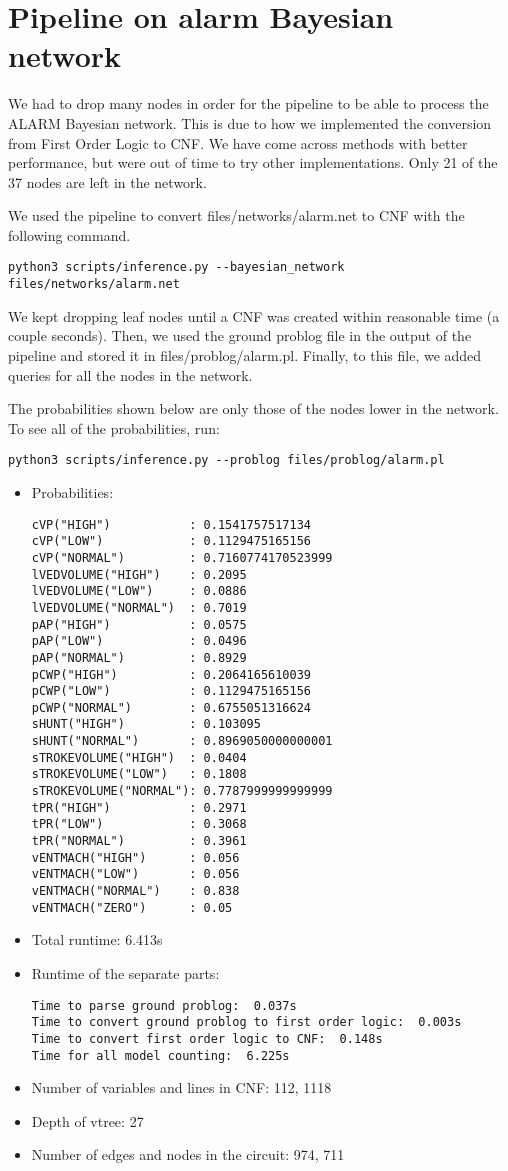 \section{Pipeline on alarm Bayesian network}
We had to drop many nodes in order for the pipeline to be able to process the ALARM Bayesian network. This is due to how we implemented the conversion from First Order Logic to CNF. We have come across methods with better performance, but were out of time to try other implementations. Only 21 of the 37 nodes are left in the network.

We used the pipeline to convert files/networks/alarm.net to CNF with the following command.
\begin{lstlisting}
python3 scripts/inference.py --bayesian_network files/networks/alarm.net
\end{lstlisting}
We kept dropping leaf nodes until a CNF was created within reasonable time (a couple seconds). Then, we used the ground problog file in the output of the pipeline and stored it in files/problog/alarm.pl. Finally, to this file, we added queries for all the nodes in the network.

The probabilities shown below are only those of the nodes lower in the network. To see all of the probabilities, run:
\begin{lstlisting}
python3 scripts/inference.py --problog files/problog/alarm.pl
\end{lstlisting}
\begin{itemize}
    \item Probabilities:
    \begin{lstlisting}
cVP("HIGH")           : 0.1541757517134
cVP("LOW")            : 0.1129475165156
cVP("NORMAL")         : 0.7160774170523999
lVEDVOLUME("HIGH")    : 0.2095
lVEDVOLUME("LOW")     : 0.0886
lVEDVOLUME("NORMAL")  : 0.7019
pAP("HIGH")           : 0.0575
pAP("LOW")            : 0.0496
pAP("NORMAL")         : 0.8929
pCWP("HIGH")          : 0.2064165610039
pCWP("LOW")           : 0.1129475165156
pCWP("NORMAL")        : 0.6755051316624
sHUNT("HIGH")         : 0.103095
sHUNT("NORMAL")       : 0.8969050000000001
sTROKEVOLUME("HIGH")  : 0.0404
sTROKEVOLUME("LOW")   : 0.1808
sTROKEVOLUME("NORMAL"): 0.7787999999999999
tPR("HIGH")           : 0.2971
tPR("LOW")            : 0.3068
tPR("NORMAL")         : 0.3961
vENTMACH("HIGH")      : 0.056
vENTMACH("LOW")       : 0.056
vENTMACH("NORMAL")    : 0.838
vENTMACH("ZERO")      : 0.05
    \end{lstlisting}
    \item Total runtime: 6.413s
    \item Runtime of the separate parts:
    \begin{lstlisting}
Time to parse ground problog:  0.037s
Time to convert ground problog to first order logic:  0.003s
Time to convert first order logic to CNF:  0.148s
Time for all model counting:  6.225s
    \end{lstlisting}
    \item Number of variables and lines in CNF: 112, 1118
    \item Depth of vtree: 27
    \item Number of edges and nodes in the circuit: 974, 711
\end{itemize}